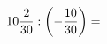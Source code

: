 \documentclass[preview]{standalone}
\begin{document}
\begin{align*}
10 { 2 \over 30 }  :  \left( - { 10 \over 30 } \right)  =
\end{align*}
\end{document}
